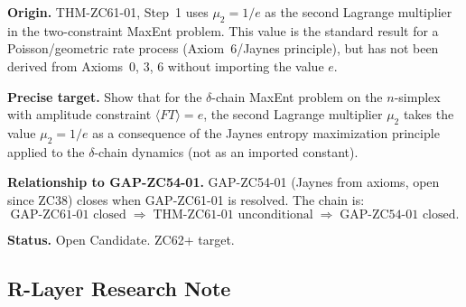 \documentclass[12pt, a4paper]{article}
\begin{document}
\begin{openqbox}[title={GAP-ZC61-01: Boltzmann Floor from Axioms
  (Open Candidate)}]
\textbf{Origin.}
THM-ZC61-01, Step~1 uses $\mu_2 = 1/e$ as the second
Lagrange multiplier in the two-constraint MaxEnt problem.
This value is the standard result for a Poisson/geometric
rate process (Axiom~6/Jaynes principle), but has not been
derived from Axioms~0, 3, 6 without importing the value $e$.

\textbf{Precise target.}
Show that for the $\delta$-chain MaxEnt problem on the
$n$-simplex with amplitude constraint $\langle FT \rangle = e$,
the second Lagrange multiplier $\mu_2$ takes the value
$\mu_2 = 1/e$ as a consequence of the Jaynes entropy
maximization principle applied to the $\delta$-chain dynamics
(not as an imported constant).

\textbf{Relationship to GAP-ZC54-01.}
GAP-ZC54-01 (Jaynes from axioms, open since ZC38) closes
when GAP-ZC61-01 is resolved.
The chain is:
\[
  \text{GAP-ZC61-01 closed}
  \;\Rightarrow\;
  \text{THM-ZC61-01 unconditional}
  \;\Rightarrow\;
  \text{GAP-ZC54-01 closed}.
\]

\textbf{Status.} Open Candidate. ZC62+ target.
\end{openqbox}

\subsection{R-Layer Research Note}
\label{sec:rlayer}
\end{document}
